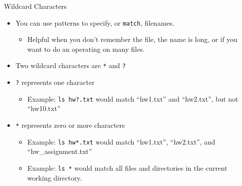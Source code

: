 \documentclass[graphics]{beamer}
\begin{document}
\begin{frame}{Wildcard Characters}
    \begin{itemize}
        \item You can use patterns to specify, or \texttt{match}, filenames.
        \begin{itemize}
            \item Helpful when you don't remember the file, the name is long, or if you want to do an operating on many files.
        \end{itemize}
        \item Two wildcard characters are \texttt{*} and \texttt{?}
        \item \texttt{?} represents one character
        \begin{itemize}
            \item Example: \texttt{ls hw?.txt} would match ``hw1.txt'' and ``hw2.txt'', but not ``hw10.txt''
        \end{itemize}
        \item \texttt{*} represents zero or more characters
        \begin{itemize}
            \item Example: \texttt{ls hw*.txt} would match ``hw1.txt'', ``hw2.txt'', and ``hw\_assignment.txt''
            \item Example: \texttt{ls *} would match all files and directories in the current working directory.
        \end{itemize}
    \end{itemize}
\end{frame}
\end{document}
